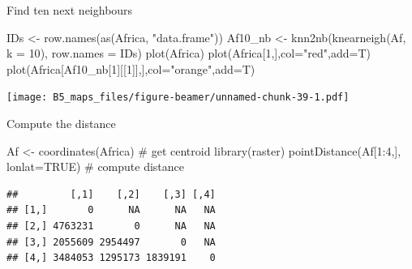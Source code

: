 \documentclass[
  10pt,
  ignorenonframetext,
]{beamer}
\newenvironment{Shaded}{\begin{snugshade}}{\end{snugshade}}
\newcommand{\CommentTok}[1]{\textcolor[rgb]{0.50,0.62,0.50}{#1}}
\newcommand{\DataTypeTok}[1]{\textcolor[rgb]{0.87,0.87,0.75}{#1}}
\newcommand{\DecValTok}[1]{\textcolor[rgb]{0.86,0.86,0.80}{#1}}
\newcommand{\KeywordTok}[1]{\textcolor[rgb]{0.94,0.87,0.69}{#1}}
\newcommand{\NormalTok}[1]{\textcolor[rgb]{0.80,0.80,0.80}{#1}}
\newcommand{\OperatorTok}[1]{\textcolor[rgb]{0.94,0.94,0.82}{#1}}
\newcommand{\OtherTok}[1]{\textcolor[rgb]{0.94,0.94,0.56}{#1}}
\newcommand{\StringTok}[1]{\textcolor[rgb]{0.80,0.58,0.58}{#1}}
\begin{document}
\begin{frame}[fragile]{Find ten next neighbours}
\protect\hypertarget{find-ten-next-neighbours}{}

\begin{Shaded}
\begin{Highlighting}[]
\NormalTok{IDs <-}\StringTok{ }\KeywordTok{row.names}\NormalTok{(}\KeywordTok{as}\NormalTok{(Africa, }\StringTok{"data.frame"}\NormalTok{))}
\NormalTok{Af10_nb <-}\StringTok{ }\KeywordTok{knn2nb}\NormalTok{(}\KeywordTok{knearneigh}\NormalTok{(Af, }\DataTypeTok{k =} \DecValTok{10}\NormalTok{), }\DataTypeTok{row.names =}\NormalTok{ IDs)}
\KeywordTok{plot}\NormalTok{(Africa)}
\KeywordTok{plot}\NormalTok{(Africa[}\DecValTok{1}\NormalTok{,],}\DataTypeTok{col=}\StringTok{"red"}\NormalTok{,}\DataTypeTok{add=}\NormalTok{T)}
\KeywordTok{plot}\NormalTok{(Africa[Af10_nb[}\DecValTok{1}\NormalTok{][[}\DecValTok{1}\NormalTok{]],],}\DataTypeTok{col=}\StringTok{"orange"}\NormalTok{,}\DataTypeTok{add=}\NormalTok{T)}
\end{Highlighting}
\end{Shaded}

\texttt{[image: B5\_maps\_files/figure-beamer/unnamed-chunk-39-1.pdf]}

\end{frame}

\begin{frame}[fragile]{Compute the distance}
\protect\hypertarget{compute-the-distance}{}

\begin{Shaded}
\begin{Highlighting}[]
\NormalTok{Af <-}\StringTok{ }\KeywordTok{coordinates}\NormalTok{(Africa) }\CommentTok{# get centroid}
\KeywordTok{library}\NormalTok{(raster)}
\KeywordTok{pointDistance}\NormalTok{(Af[}\DecValTok{1}\OperatorTok{:}\DecValTok{4}\NormalTok{,], }\DataTypeTok{lonlat=}\OtherTok{TRUE}\NormalTok{) }\CommentTok{# compute distance}
\end{Highlighting}
\end{Shaded}

\begin{verbatim}
##         [,1]    [,2]    [,3] [,4]
## [1,]       0      NA      NA   NA
## [2,] 4763231       0      NA   NA
## [3,] 2055609 2954497       0   NA
## [4,] 3484053 1295173 1839191    0
\end{verbatim}

\end{frame}
\end{document}
